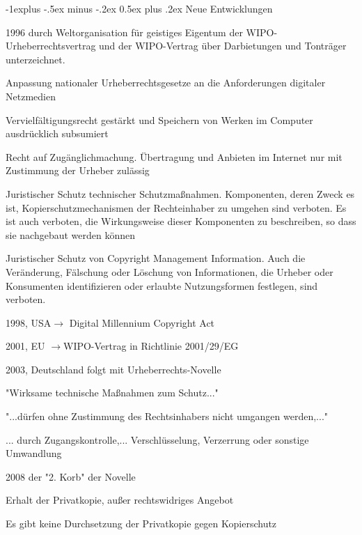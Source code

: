 \documentclass[a4paper]{article}
\makeatletter
\renewcommand{\subsection}{\@startsection{subsection}{2}{0mm}%
                                {-1explus -.5ex minus -.2ex}%
                                {0.5ex plus .2ex}%
                                {\normalfont\normalsize\bfseries}}
\makeatother
\begin{document}
\begin{multicols*}{2}
  \subsection{Neue Entwicklungen}
  \begin{itemize*}
    \item 1996 durch Weltorganisation für geistiges Eigentum der WIPO-Urheberrechtsvertrag und der WIPO-Vertrag über Darbietungen und Tonträger unterzeichnet.
    \begin{itemize*}
      \item Anpassung nationaler Urheberrechtsgesetze an die Anforderungen digitaler Netzmedien
      \item Vervielfältigungsrecht gestärkt und Speichern von Werken im Computer ausdrücklich subsumiert
      \item Recht auf Zugänglichmachung. Übertragung und Anbieten im Internet nur mit Zustimmung der Urheber zulässig
      \item Juristischer Schutz technischer Schutzmaßnahmen. Komponenten, deren Zweck es ist, Kopierschutzmechanismen der Rechteinhaber zu umgehen sind verboten. Es ist auch verboten, die Wirkungsweise dieser Komponenten zu beschreiben, so dass sie nachgebaut werden können
      \item Juristischer Schutz von Copyright Management Information. Auch die Veränderung, Fälschung oder Löschung von Informationen, die Urheber oder Konsumenten identifizieren oder erlaubte Nutzungsformen festlegen, sind verboten.
    \end{itemize*}
    \item 1998, USA$\rightarrow$ Digital Millennium Copyright Act
    \item 2001, EU $\rightarrow$WIPO-Vertrag in Richtlinie 2001/29/EG
    \item 2003, Deutschland folgt mit Urheberrechts-Novelle
    \begin{itemize*}
      \item "Wirksame technische Maßnahmen zum Schutz..."
      \item "...dürfen ohne Zustimmung des Rechtsinhabers nicht umgangen werden,..."
      \item ... durch Zugangskontrolle,... Verschlüsselung, Verzerrung oder sonstige Umwandlung
    \end{itemize*}
    \item 2008 der "2. Korb" der Novelle
    \begin{itemize*}
      \item Erhalt der Privatkopie, außer rechtswidriges Angebot
      \item Es gibt keine Durchsetzung der Privatkopie gegen Kopierschutz
    \end{itemize*}
  \end{itemize*}


\end{multicols*}
\end{document}
